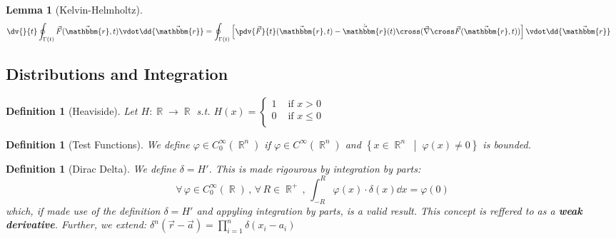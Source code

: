 \documentclass[12pt]{article}
\renewcommand{\curl}{\vec{\nabla}\cross}
\newcommand{\set}[2]{\left\{{#1}\;\middle|\;{#2}\right\}}
\newcommand{\Forall}[1]{\forall\,{#1}\,,\,}
\DeclareMathOperator{\R}{\mathbb{R}}
\newcommand*{\rv}{\vec{r}}
\newcommand*{\vF}{\vec{F}}
\newcommand*{\irv}{\vec{\mathbbm{r}}}
\newtheorem{definition}[theorem]{Definition}
\newtheorem{lemma}[theorem]{Lemma}
\begin{document}
\begin{lemma}[Kelvin-Helmholtz]
  \label{kelvin_helmholtz}
  \begin{align*}
    \dv{}{t}\oint_{\Gamma(t)}\vF(\irv,t)\vdot\dd{\irv}&=\oint_{\Gamma(t)}\left[\pdv{\vF}{t}(\irv,t)-\dot{\irv}(t)\cross(\curl\vF(\irv,t))\right]\vdot\dd{\irv}
  \end{align*}
\end{lemma}

\pagebreak

\subsection{Distributions and Integration}


\begin{definition}[Heaviside]
  Let $H:\R\to\R$ s.t. $H(x)=
  \begin{cases}
    1 &\text{ if }x> 0\\
    0 &\text{ if }x\leq 0\\
  \end{cases}$
\end{definition}

\begin{definition}[Test Functions]
  We define $\varphi\in C_0^\infty(\R^n)$ if $\varphi\in C^\infty(\R^n)$ and $\set{x\in\R^n}{\varphi(x)\neq 0}$ is bounded.
\end{definition}

\begin{definition}[Dirac Delta]
  We define $\delta=H'$. This is made rigourous by integration by parts: $$\Forall{\varphi\in C_0^\infty(\R)}\Forall{R\in\R^+}\int_{-R}^R\varphi(x)\cdot\delta(x)\dd{x}=\varphi(0)$$
  which, if made use of the definition $\delta=H'$ and appyling integration by parts, is a valid result. This concept is reffered to as a \textbf{weak derivative}. Further, we extend: $\displaystyle \delta^n(\rv-\vec{a})=\prod_{i=1}^n \delta(x_i-a_i)$
\end{definition}
\end{document}

